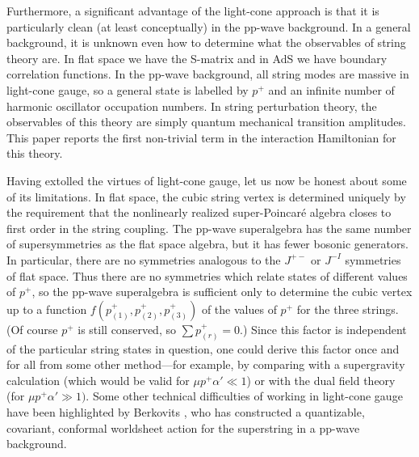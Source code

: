
Furthermore, a significant advantage of the light-cone approach
is that it is particularly clean (at least conceptually)
in the pp-wave background.
In a general background,
it is unknown even how to determine what the observables of string
theory are.
In flat space we have the S-matrix and
in AdS we have boundary correlation functions.  
In the pp-wave background, all string modes are massive in light-cone gauge,
so a general state is labelled by $p^+$ and an infinite number of
harmonic oscillator occupation numbers.
In string perturbation theory, the observables of this theory
are simply quantum mechanical transition amplitudes.
This paper reports the first non-trivial term in
the interaction Hamiltonian for this theory.


Having extolled the virtues of light-cone gauge, let us now be
honest about some of its limitations.
In flat space, the cubic string vertex is determined uniquely by
the requirement that the nonlinearly realized super-Poincar\'e
algebra closes to first order in the string coupling.
The pp-wave superalgebra  has the same number of supersymmetries
as the flat space algebra,
but it has fewer bosonic generators.  In
particular, there are no symmetries analogous to the $J^{+-}$ or $J^{-I}$
symmetries of flat space.
Thus there are no symmetries which relate states of different
values of $p^+$, so the pp-wave superalgebra is sufficient only
to determine the cubic vertex up to a
function $f(p^+_{(1)}, p^+_{(2)},
p^+_{(3)})$ of the values of $p^+$ for the three strings.
(Of course $p^+$ is still conserved, so $\sum p^+_{(r)} = 0$.)
Since this factor is independent of the particular string states
in question, one could derive this factor once and for all from
some other method---for example, by comparing with a supergravity
calculation (which would be valid for $\mu p^+ \alpha' \ll 1$)
or with the dual field theory (for $\mu p^+ \alpha' \gg 1)$.
Some other technical difficulties of working in light-cone gauge
have been highlighted by Berkovits \BerkovitsZV, who has constructed
a quantizable, covariant,
conformal worldsheet action for the superstring in a
pp-wave background.



